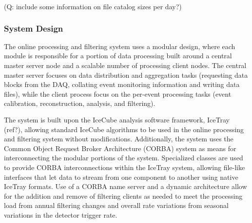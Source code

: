 (Q:  include some information on file catalog sizes per day?)

\subsubsection{System Design}

The online processing and filtering system uses a modular design, where each module
is responsible for a portion of data processing built around a central master server node and a
scalable number of processing client nodes.  The central master server focuses on
data distribution and aggregation tasks (requesting data blocks from the DAQ, collating event
monitoring information and writing data files), while the client process focus on the per-event
processing tasks (event calibration, reconstruction, analysis, and filtering).  

The system is built upon the IceCube analysis software framework, IceTray (ref?), allowing standard IceCube algorithms to
be used in the online processing and filtering system without modifications.  Additionally, the system uses the 
Common Object Request Broker Architecture (CORBA) system as means for interconnecting
the modular portions of the system.  Specialized classes are used to provide CORBA interconnections
within the IceTray system, allowing file-like interfaces that let data to stream from one component to another 
using native IceTray formats.  Use of a CORBA name server and a dynamic architecture allow for the
addition and remove of filtering clients as needed to meet the processing load from annual filtering
changes and overall rate variations from seasonal variations in the detector trigger rate.

